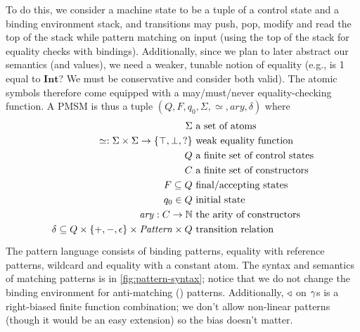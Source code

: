 \documentclass[preprint,onecolumn,9pt]{sigplanconf} %
\begin{document}
To do this, we consider a machine state to be a tuple of a control state and a binding environment stack, and transitions may push, pop, modify and read the top of the stack while pattern matching on input (using the top of the stack for equality checks with bindings).
%
Additionally, since we plan to later abstract our semantics (and values), we need a weaker, tunable notion of equality (e.g., is 1 equal to $\mathbf{Int}$? We must be conservative and consider both valid).
%
The atomic symbols therefore come equipped with a may/must/never equality-checking function.
%
A PMSM is thus a tuple $(Q, F, q_0, \Sigma, \simeq, \mathit{ary}, \delta)$ where
\begin{align*}
  \Sigma &\text{ a set of atoms} \\
  \simeq : \Sigma \times \Sigma \to \{\top, \bot, ?\} &\text{ weak equality function}\\
  Q &\text{ a finite set of control states} \\
  C &\text{ a finite set of constructors} \\
  F \subseteq Q &\text{ final/accepting states} \\
  q_0 \in Q &\text{ initial state} \\
  \mathit{ary} : C \to {\mathbb N}&\text{ the arity of constructors} \\
  \delta \subseteq Q \times \{+, -, \epsilon\} \times \mathit{Pattern} \times Q & \text{ transition relation}\\[2pt]
\end{align*}
The pattern language consists of binding patterns, equality with reference patterns, wildcard and equality with a constant atom.
%
The syntax and semantics of matching patterns is in \autoref{fig:pattern-syntax}; notice that we do not change the binding environment for anti-matching ($\!$) patterns.
%
Additionally, $\triangleleft$ on $\gamma$s is a right-biased finite function combination; we don't allow non-linear patterns (though it would be an easy extension) so the bias doesn't matter.
%
\end{document}
